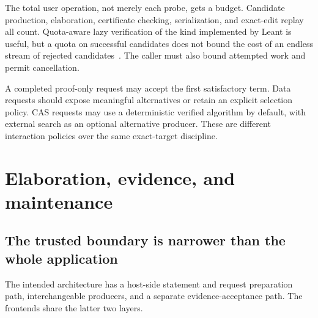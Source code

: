 \documentclass[11pt,letterpaper]{article}
\theoremstyle{definition}
\theoremstyle{remark}
\begin{document}
The total user operation, not merely each probe, gets a budget. Candidate
production, elaboration, certificate checking, serialization, and exact-edit
replay all count. Quota-aware lazy verification of the kind implemented by
Leant is useful, but a quota on successful candidates does not bound the cost
of an endless stream of rejected candidates~\cite{l-verify}. The caller must
also bound attempted work and permit cancellation.

A completed proof-only request may accept the first satisfactory term. Data
requests should expose meaningful alternatives or retain an explicit selection
policy. CAS requests may use a deterministic verified algorithm by default,
with external search as an optional alternative producer. These are different
interaction policies over the same exact-target discipline.

\section{Elaboration, evidence, and maintenance}
\label{sec:evidence}

\subsection{The trusted boundary is narrower than the whole application}
The intended architecture has a host-side statement and request preparation
path, interchangeable producers, and a separate evidence-acceptance path.
The frontends share the latter two layers.

\begin{center}
\end{center}
\end{document}
